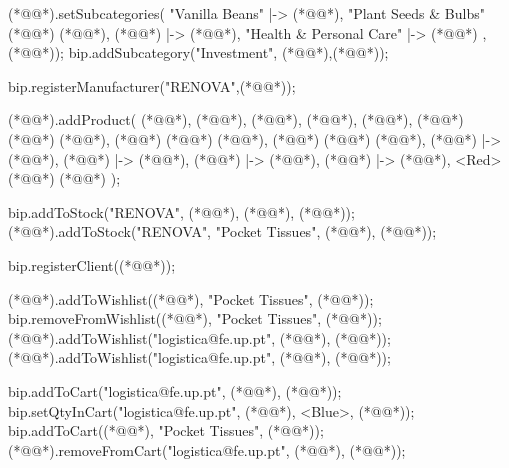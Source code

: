 \begin{vdmpp}[breaklines=true]
  (*@@*).setSubcategories({
  "Vanilla Beans" |-> (*@@*),
  "Plant Seeds & Bulbs" (*@\vdmnotcovered{|->}@*) (*@@*),
  (*@@*) |-> (*@@*),
  "Health & Personal Care" |-> (*@@*)
  },(*@@*));
  bip.addSubcategory("Investment", (*@@*),(*@@*));
  
  bip.registerManufacturer("RENOVA",(*@@*));
  
  (*@@*).addProduct(
   (*@@*),
  (*@@*),
  (*@@*),
  (*@@*),
  (*@@*),
  {(*@@*) (*@\vdmnotcovered{|->}@*) (*@@*),
   (*@@*) (*@\vdmnotcovered{|->}@*) (*@@*),
   (*@@*) (*@\vdmnotcovered{|->}@*) (*@@*),
   (*@@*) |-> (*@@*),
   (*@@*) |-> (*@@*),
   (*@@*) |-> (*@@*),
   (*@@*) |-> (*@@*),
   <Red> (*@\vdmnotcovered{|->}@*) (*@@*)
  });
  
  bip.addToStock("RENOVA", (*@@*), (*@@*), (*@@*));
  (*@@*).addToStock("RENOVA", "Pocket Tissues", (*@@*), (*@@*));
  
  bip.registerClient((*@@*));
  
  (*@@*).addToWishlist((*@@*), "Pocket Tissues", (*@@*));
  bip.removeFromWishlist((*@@*), "Pocket Tissues", (*@@*));
  (*@@*).addToWishlist("logistica@fe.up.pt", (*@@*), (*@@*));
  (*@@*).addToWishlist("logistica@fe.up.pt", (*@@*), (*@@*));
  
  bip.addToCart("logistica@fe.up.pt", (*@@*), (*@@*));
  bip.setQtyInCart("logistica@fe.up.pt", (*@@*), <Blue>, (*@@*));
  bip.addToCart((*@@*), "Pocket Tissues", (*@@*));
  (*@@*).removeFromCart("logistica@fe.up.pt", (*@@*), (*@@*));
  

\end{vdmpp}
